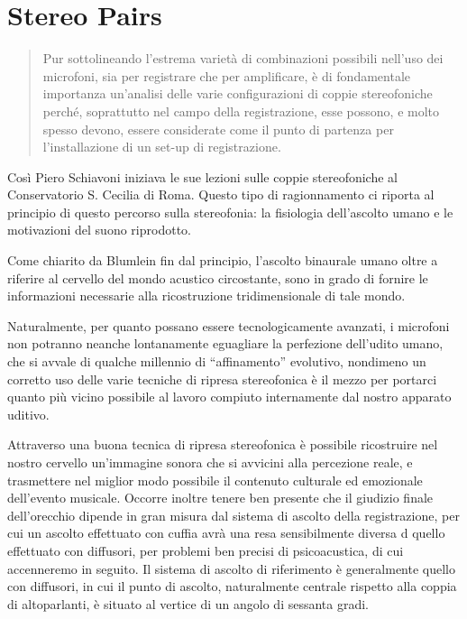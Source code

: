 \section{Stereo Pairs}

\begin{quote}
Pur sottolineando l’estrema varietà di combinazioni possibili nell’uso dei
microfoni, sia per registrare che per amplificare, è di fondamentale importanza
un’analisi delle varie configurazioni di coppie stereofoniche perché,
soprattutto nel campo della registrazione, esse possono, e molto spesso devono,
essere considerate come il punto di partenza per l’installazione di un set-up
di registrazione.
\end{quote}

Così  Piero Schiavoni iniziava le sue lezioni
sulle coppie stereofoniche al Conservatorio S. Cecilia di Roma. Questo tipo di
ragionnamento ci riporta al principio di questo percorso sulla stereofonia:
la fisiologia dell'ascolto umano e le motivazioni del suono riprodotto.

Come chiarito da Blumlein \cite{ab58} fin dal principio, l'ascolto binaurale umano
oltre a riferire al cervello del mondo acustico circostante, sono in grado di
fornire le informazioni necessarie alla ricostruzione tridimensionale di tale
mondo.


Naturalmente, per quanto possano
essere tecnologicamente avanzati, i microfoni non potranno neanche lontanamente
eguagliare la perfezione dell’udito umano, che si avvale di qualche millennio
di “affinamento” evolutivo, nondimeno un corretto uso delle varie tecniche di
ripresa stereofonica è il mezzo per portarci quanto più vicino possibile al
lavoro compiuto internamente dal nostro apparato uditivo.

Attraverso una buona tecnica di ripresa stereofonica è possibile ricostruire nel
nostro cervello un’immagine sonora che si avvicini alla percezione reale, e
trasmettere nel miglior modo possibile il contenuto culturale ed emozionale
dell’evento musicale. Occorre inoltre tenere ben presente che il giudizio finale
dell’orecchio dipende in gran misura dal sistema di ascolto della registrazione,
per cui un ascolto effettuato con cuffia avrà una resa sensibilmente diversa d
quello effettuato con diffusori, per problemi ben precisi di psicoacustica, di
cui accenneremo in seguito. Il sistema di ascolto di riferimento è generalmente
quello con diffusori, in cui il punto di ascolto, naturalmente centrale rispetto
alla coppia di altoparlanti, è situato al vertice di un angolo di sessanta gradi.

